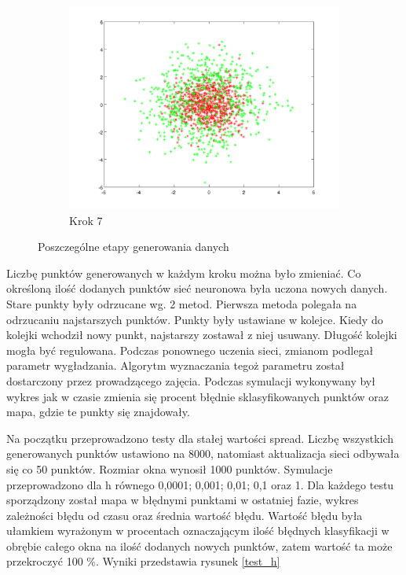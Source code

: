 \documentclass[10pt,a4paper]{article}
\begin{document}
\begin{figure}[h]
  \begin{center}
  \begin{subfigure}[b]{0.4\textwidth}
    \includegraphics[width=\textwidth]{dataGen_step6.png}
    \caption{Krok 7}
  \end{subfigure}
  \end{center}
  
  \caption{Poszczególne etapy generowania danych}
  \label{dataGen}
  
\end{figure}
Liczbę punktów generowanych w każdym kroku można było zmieniać. Co określoną ilość dodanych punktów sieć neuronowa była uczona nowych danych. Stare punkty były odrzucane wg. 2 metod. Pierwsza metoda polegała na odrzucaniu najstarszych punktów. Punkty były ustawiane w kolejce. Kiedy do kolejki wchodził nowy punkt, najstarszy zostawał z niej usuwany. Długość kolejki mogła być regulowana. Podczas ponownego uczenia sieci, zmianom podlegał parametr wygładzania. Algorytm wyznaczania tegoż parametru został dostarczony przez prowadzącego zajęcia. Podczas symulacji wykonywany był wykres jak w czasie zmienia się procent błędnie sklasyfikowanych punktów oraz mapa, gdzie te punkty się znajdowały. 

Na początku przeprowadzono testy dla stałej wartości spread. Liczbę wszystkich generowanych punktów ustawiono na 8000, natomiast aktualizacja sieci odbywała się co 50 punktów. Rozmiar okna wynosił 1000 punktów. Symulacje przeprowadzono dla h równego 0,0001; 0,001; 0,01; 0,1 oraz 1. Dla każdego testu sporządzony został mapa w błędnymi punktami w ostatniej fazie, wykres zależności błędu od czasu oraz średnia wartość błędu. Wartość błędu była ułamkiem wyrażonym w procentach oznaczającym ilość błędnych klasyfikacji w obrębie całego okna na ilość dodanych nowych punktów, zatem wartość ta może przekroczyć 100 \%. Wyniki przedstawia rysunek \ref{test_h}
\end{document}
